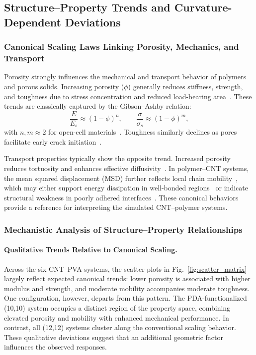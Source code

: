 \documentclass[journal=jacsat,manuscript=article]{achemso}
\begin{document}
{\subsection{Structure–Property Trends and Curvature-Dependent Deviations}

\subsubsection{Canonical Scaling Laws Linking Porosity, Mechanics, and Transport}

Porosity strongly influences the mechanical and transport behavior of polymers and porous solids. Increasing porosity ($\phi$) generally reduces stiffness, strength, and toughness due to stress concentration and reduced load-bearing area~\cite{Gibson1997,Rice1968,Huang2020}. These trends are classically captured by the Gibson–Ashby relation:
\[
    \frac{E}{E_s} \approx (1-\phi)^n,\qquad 
    \frac{\sigma}{\sigma_s} \approx (1-\phi)^m,
\]
with $n,m\approx2$ for open-cell materials~\cite{Gibson1997}. Toughness similarly declines as pores facilitate early crack initiation~\cite{Anderson2017,Budiansky1978}.

Transport properties typically show the opposite trend. Increased porosity reduces tortuosity and enhances effective diffusivity~\cite{Millington1961,Shen2018}. In polymer–CNT systems, the mean squared displacement (MSD) further reflects local chain mobility~\cite{skountzos2018molecular}, which may either support energy dissipation in well-bonded regions~\cite{Bucknall2013,Arruda1993} or indicate structural weakness in poorly adhered interfaces~\cite{Qi2009}. These canonical behaviors provide a reference for interpreting the simulated CNT–polymer systems.

\subsubsection{Mechanistic Analysis of Structure–Property Relationships}

\paragraph{Qualitative Trends Relative to Canonical Scaling.}
Across the six CNT–PVA systems, the scatter plots in Fig.~\ref{fig:scatter_matrix} largely reflect expected canonical trends: lower porosity is associated with higher modulus and strength, and moderate mobility accompanies moderate toughness. One configuration, however, departs from this pattern. The PDA-functionalized (10,10) system occupies a distinct region of the property space, combining elevated porosity and mobility with enhanced mechanical performance. In contrast, all (12,12) systems cluster along the conventional scaling behavior. These qualitative deviations suggest that an additional geometric factor influences the observed responses.

}
\end{document}
